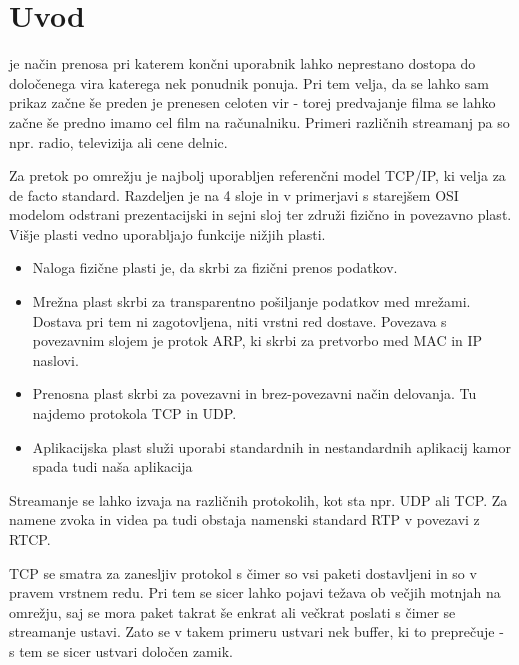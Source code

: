 \documentclass[journal]{IEEEtran}
\begin{document}
\section{Uvod}
% 
% 
% 
% 
 je način prenosa pri katerem končni uporabnik lahko neprestano dostopa do določenega vira katerega nek ponudnik ponuja. Pri tem velja, da se lahko sam prikaz začne še preden je prenesen celoten vir - torej predvajanje filma se lahko začne še predno imamo cel film na računalniku. Primeri različnih streamanj pa so npr. radio, televizija ali cene delnic.

Za pretok po omrežju je najbolj uporabljen referenčni model TCP/IP, ki velja za de facto standard. Razdeljen je na 4 sloje in v primerjavi s starejšem OSI modelom odstrani prezentacijski in sejni sloj ter združi fizično in povezavno plast. Višje plasti vedno uporabljajo funkcije nižjih plasti.

\begin{itemize}
	\item Naloga fizične plasti je, da skrbi za fizični prenos podatkov. 
	\item  Mrežna plast skrbi za transparentno pošiljanje podatkov med mrežami. Dostava pri tem ni zagotovljena, niti vrstni red dostave. Povezava s povezavnim slojem je protok ARP, ki skrbi za pretvorbo med MAC in IP naslovi.
	\item Prenosna plast skrbi za povezavni in brez-povezavni način delovanja. Tu najdemo protokola TCP in UDP.
	\item Aplikacijska plast služi uporabi standardnih in nestandardnih aplikacij kamor spada tudi naša aplikacija
\end{itemize}

Streamanje se lahko izvaja na različnih protokolih, kot sta npr. UDP ali TCP. Za namene zvoka in videa pa tudi obstaja namenski standard RTP v povezavi z RTCP.

TCP se smatra za zanesljiv protokol s čimer so vsi paketi dostavljeni in so v pravem vrstnem redu. Pri tem se sicer lahko pojavi težava ob večjih motnjah na omrežju, saj se mora paket takrat še enkrat ali večkrat poslati s čimer se streamanje ustavi. Zato se v takem primeru ustvari nek buffer, ki to preprečuje - s tem se sicer ustvari določen zamik.
\end{document}
